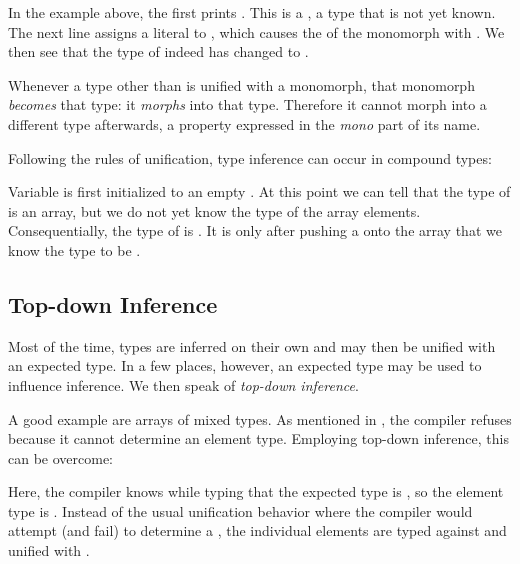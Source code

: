 \documentclass{haxe}
\begin{document}
In the example above, the first  prints . This is a , a type that is not yet known. The next line  assigns a  literal to , which causes the  of the monomorph with . We then see that the type of  indeed has changed to .

Whenever a type other than  is unified with a monomorph, that monomorph \emph{becomes} that type: it \emph{morphs} into that type. Therefore it cannot morph into a different type afterwards, a property expressed in the \emph{mono} part of its name.

Following the rules of unification, type inference can occur in compound types:

Variable  is first initialized to an empty . At this point we can tell that the type of  is an array, but we do not yet know the type of the array elements. Consequentially, the type of  is . It is only after pushing a  onto the array that we know the type to be .


\subsection{Top-down Inference}
\label{type-system-top-down-inference}

Most of the time, types are inferred on their own and may then be unified with an expected type. In a few places, however, an expected type may be used to influence inference. We then speak of \emph{top-down inference}.


A good example are arrays of mixed types. As mentioned in , the compiler refuses \expr{[1, "foo"]} because it cannot determine an element type. Employing top-down inference, this can be overcome:


Here, the compiler knows while typing \expr{[1, "foo"]} that the expected type is , so the element type is . Instead of the usual unification behavior where the compiler would attempt (and fail) to determine a , the individual elements are typed against and unified with .
\end{document}
